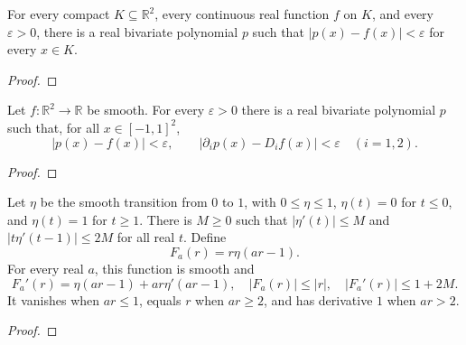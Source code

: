 \begin{supporting}


\begin{theorem}
\label{thm:multivariate-uniform-approximation}
\leanok
For every compact $K\subseteq\mathbb R^2$, every continuous real function
$f$ on $K$, and every $\varepsilon>0$, there is a real bivariate polynomial
$p$ such that $|p(x)-f(x)|<\varepsilon$ for every $x\in K$.
\end{theorem}
\begin{proof}
\leanok
\end{proof}

\begin{theorem}
\label{thm:multivariate-C1-approximation}
\leanok
Let $f:\mathbb R^2\to\mathbb R$ be smooth. For every $\varepsilon>0$ there
is a real bivariate polynomial $p$ such that, for all $x\in[-1,1]^2$,
\[
 |p(x)-f(x)|<\varepsilon,\qquad
 |\partial_i p(x)-D_i f(x)|<\varepsilon\quad(i=1,2).
\]
\end{theorem}
\begin{proof}
\leanok
\end{proof}

\begin{theorem}
\label{thm:smooth-boundary-factor}
\leanok
Let $\eta$ be the smooth transition from $0$ to $1$, with $0\leq\eta\leq1$,
$\eta(t)=0$ for $t\leq0$, and $\eta(t)=1$ for $t\geq1$.
There is $M\geq0$ such that $|\eta'(t)|\leq M$ and
$|t\eta'(t-1)|\leq2M$ for all real $t$. Define
\[
 F_a(r)=r\eta(ar-1).
\]
For every real $a$, this function is smooth and
\[
 F_a'(r)=\eta(ar-1)+ar\eta'(ar-1),\quad
 |F_a(r)|\leq|r|,\quad |F_a'(r)|\leq1+2M.
\]
It vanishes when $ar\leq1$, equals $r$ when $ar\geq2$, and has derivative
$1$ when $ar>2$.
\end{theorem}
\begin{proof}
\leanok
\end{proof}



\end{supporting}
